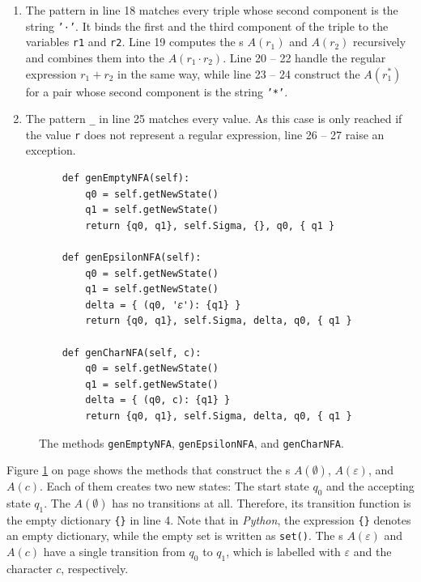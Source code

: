 \begin{enumerate}
\begin{enumerate}
            matters:  The case in line 14 has to precede the case in line 16.
      \item The pattern in line 18 matches every triple whose second component is the string \texttt{'⋅'}.  It
            binds the first and the third component of the triple to the variables \texttt{r1} and \texttt{r2}.
            Line 19 computes the s $A(r_1)$ and $A(r_2)$ recursively and combines them into the
             $A(r_1 \cdot r_2)$.  Line 20 -- 22 handle the regular expression $r_1 + r_2$ in the
            same way, while line 23 -- 24 construct the  $A(r_1^*)$ for a pair whose second
            component is the string \texttt{'*'}.
      \item The pattern \texttt{\_} in line 25 matches every value.  As this case is only reached if the value
            \texttt{r} does not represent a regular expression, line 26 -- 27 raise an exception.
      \end{enumerate}
\end{enumerate}

\begin{figure}[!ht]
\centering
\begin{verbatim}
    def genEmptyNFA(self):
        q0 = self.getNewState()
        q1 = self.getNewState()
        return {q0, q1}, self.Sigma, {}, q0, { q1 }

    def genEpsilonNFA(self):
        q0 = self.getNewState()
        q1 = self.getNewState()
        delta = { (q0, '𝜀'): {q1} }
        return {q0, q1}, self.Sigma, delta, q0, { q1 }

    def genCharNFA(self, c):
        q0 = self.getNewState()
        q1 = self.getNewState()
        delta = { (q0, c): {q1} }
        return {q0, q1}, self.Sigma, delta, q0, { q1 }
\end{verbatim}
\vspace*{-0.3cm}
\caption{The methods \texttt{genEmptyNFA}, \texttt{genEpsilonNFA}, and \texttt{genCharNFA}.}
\label{fig:03-Regexp-2-NFA.ipynb:genEmptyNFA}
\end{figure}

\noindent
Figure \ref{fig:03-Regexp-2-NFA.ipynb:genEmptyNFA} on page \pageref{fig:03-Regexp-2-NFA.ipynb:genEmptyNFA} shows
the methods that construct the s $A(\emptyset)$, $A(\varepsilon)$, and $A(c)$.  Each of them creates
two new states:  The start state $q_0$ and the accepting state $q_1$.  The  $A(\emptyset)$ has no
transitions at all.  Therefore, its transition function is the empty dictionary \texttt{\{\}} in line 4.  Note that
in \textsl{Python}, the expression \texttt{\{\}} denotes an empty dictionary, while the empty set is written as
\texttt{set()}.  The s $A(\varepsilon)$ and $A(c)$ have a single transition from $q_0$ to $q_1$,
which is labelled with $\varepsilon$ and the character $c$, respectively.

